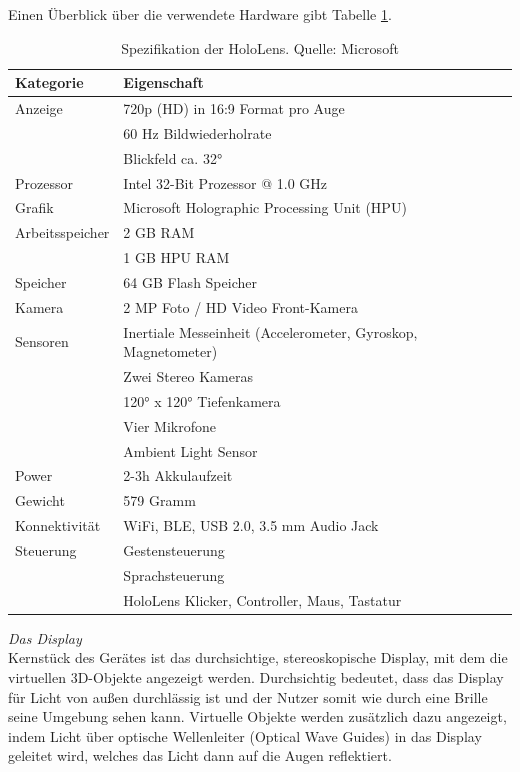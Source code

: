 Einen Überblick über die verwendete Hardware gibt Tabelle \ref{tab:hololens_tech_details}.

\setlength\extrarowheight{2pt}
\begin{table}[htb]
	\centering
	\begin{tabular}{l|l}
		Kategorie & Eigenschaft\\
		\hline
		Anzeige & 720p (HD) in 16:9 Format pro Auge\\
		& 60 Hz Bildwiederholrate\\
		& Blickfeld ca. 32°\\
		Prozessor & Intel 32-Bit Prozessor @ 1.0 GHz\\
		Grafik & Microsoft Holographic Processing Unit (HPU)\\
		Arbeitsspeicher & 2 GB RAM\\
		& 1 GB HPU RAM\\
		Speicher & 64 GB Flash Speicher\\
		Kamera & 2 MP Foto / HD Video Front-Kamera\\
		Sensoren & Inertiale Messeinheit (Accelerometer, Gyroskop, Magnetometer) \\
		& Zwei Stereo Kameras\\
		& 120° x 120° Tiefenkamera\\
		& Vier Mikrofone\\
		& Ambient Light Sensor\\
		Power & 2-3h Akkulaufzeit \\
		Gewicht & 579 Gramm \\
		Konnektivität & WiFi, BLE, USB 2.0, 3.5 mm Audio Jack \\
		Steuerung & Gestensteuerung\\
		& Sprachsteuerung\\
		& HoloLens Klicker, Controller, Maus, Tastatur\\
	\end{tabular}\caption{\label{tab:hololens_tech_details} Spezifikation der HoloLens. Quelle: Microsoft}
\end{table}

\vspace{4px}
\textit{Das Display}\\
Kernstück des Gerätes ist das durchsichtige, stereoskopische Display, mit dem die virtuellen 3D-Objekte angezeigt werden. Durchsichtig bedeutet, dass das Display für Licht von außen durchlässig ist und der Nutzer somit wie durch eine Brille seine Umgebung sehen kann. Virtuelle Objekte werden zusätzlich dazu angezeigt, indem Licht über optische Wellenleiter (Optical Wave Guides) in das Display geleitet wird, welches das Licht dann auf die Augen reflektiert.\\

